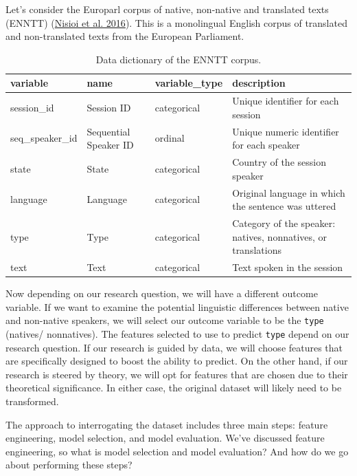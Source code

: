 \documentclass[
  letterpaper,
  DIV=11,
  numbers=noendperiod]{scrreport}
\theoremstyle{definition}
\theoremstyle{remark}
\begin{document}
Let's consider the Europarl corpus of native, non-native and translated
texts (ENNTT) (\protect\hyperlink{ref-Nisioi2016}{Nisioi et al. 2016}).
This is a monolingual English corpus of translated and non-translated
texts from the European Parliament.

\hypertarget{tbl-enntt-dd}{}
\begin{table}
\caption{\label{tbl-enntt-dd}Data dictionary of the ENNTT corpus. }\tabularnewline

\centering
\begin{tabular}{l|l|l|l}
\hline
variable & name & variable\_type & description\\
\hline
session\_id & Session ID & categorical & Unique identifier for each session\\
\hline
seq\_speaker\_id & Sequential Speaker ID & ordinal & Unique numeric identifier for each speaker\\
\hline
state & State & categorical & Country of the session speaker\\
\hline
language & Language & categorical & Original language in which the sentence was uttered\\
\hline
type & Type & categorical & Category of the speaker: natives, nonnatives, or translations\\
\hline
text & Text & categorical & Text spoken in the session\\
\hline
\end{tabular}
\end{table}

Now depending on our research question, we will have a different outcome
variable. If we want to examine the potential linguistic differences
between native and non-native speakers, we will select our outcome
variable to be the \texttt{type} (natives/ nonnatives). The features
selected to use to predict \texttt{type} depend on our research
question. If our research is guided by data, we will choose features
that are specifically designed to boost the ability to predict. On the
other hand, if our research is steered by theory, we will opt for
features that are chosen due to their theoretical significance. In
either case, the original dataset will likely need to be transformed.

The approach to interrogating the dataset includes three main steps:
feature engineering, model selection, and model evaluation. We've
discussed feature engineering, so what is model selection and model
evaluation? And how do we go about performing these steps?
\end{document}
